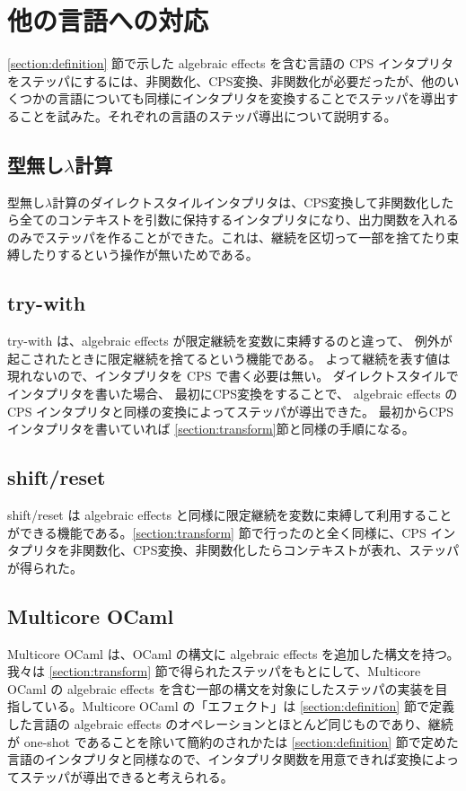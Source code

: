 \section{他の言語への対応}
\label{section:languages}

\ref{section:definition} 節で示した algebraic effects を含む言語の CPS インタプリタをステッパにするには、非関数化、CPS変換、非関数化が必要だったが、他のいくつかの言語についても同様にインタプリタを変換することでステッパを導出することを試みた。それぞれの言語のステッパ導出について説明する。


\subsection{型無し$\lambda$計算}
\label{subsection:lambda}

型無し$\lambda$計算のダイレクトスタイルインタプリタは、CPS変換して非関数化したら全てのコンテキストを引数に保持するインタプリタになり、出力関数を入れるのみでステッパを作ることができた。これは、継続を区切って一部を捨てたり束縛したりするという操作が無いためである。


\subsection{try-with}
\label{subsection:try_with}

try-with は、algebraic effects が限定継続を変数に束縛するのと違って、
例外が起こされたときに限定継続を捨てるという機能である。
よって継続を表す値は現れないので、インタプリタを CPS で書く必要は無い。
ダイレクトスタイルでインタプリタを書いた場合、
最初にCPS変換をすることで、
algebraic effects の CPS インタプリタと同様の変換によってステッパが導出できた。
最初からCPSインタプリタを書いていれば \ref{section:transform}節と同様の手順になる。


\subsection{shift/reset}
\label{subsection:shift/reset}

shift/reset は algebraic effects と同様に限定継続を変数に束縛して利用することができる機能である。\ref{section:transform} 節で行ったのと全く同様に、CPS インタプリタを非関数化、CPS変換、非関数化したらコンテキストが表れ、ステッパが得られた。


\subsection{Multicore OCaml}
\label{subsection:multicore_ocaml}

Multicore OCaml は、OCaml の構文に algebraic effects を追加した構文を持つ。我々は \ref{section:transform} 節で得られたステッパをもとにして、Multicore OCaml の algebraic effects を含む一部の構文を対象にしたステッパの実装を目指している。Multicore OCaml の「エフェクト」は \ref{section:definition} 節で定義した言語の algebraic effects のオペレーションとほとんど同じものであり、継続が one-shot であることを除いて簡約のされかたは \ref{section:definition} 節で定めた言語のインタプリタと同様なので、インタプリタ関数を用意できれば変換によってステッパが導出できると考えられる。
